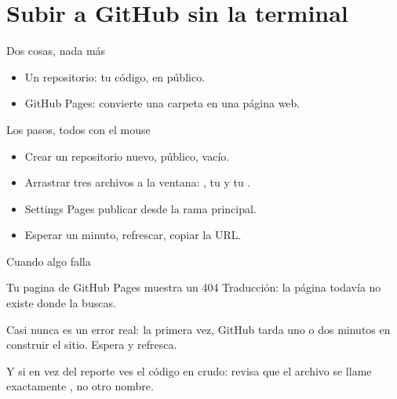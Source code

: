 \section{Subir a GitHub sin la terminal}

\begin{frame}{Dos cosas, nada más}
  \vspace{0.3em}
  \begin{itemize}\setlength{\itemsep}{0.9em}
    \item<1-> Un repositorio: tu código, en público.
    \item<2-> \ac{GitHub Pages}: convierte una carpeta en una página web.
  \end{itemize}

  \vspace{1.2em}
\end{frame}

\begin{frame}{Los pasos, todos con el mouse}
  \vspace{0.2em}
  \begin{itemize}\setlength{\itemsep}{0.75em}
    \item<1-> Crear un repositorio nuevo, público, vacío.
    \item<2-> Arrastrar tres archivos a la ventana: ,
          tu  y tu .
    \item<3-> \ac{Settings} \textrightarrow{} \ac{Pages} \textrightarrow{}
          publicar desde la rama principal.
    \item<4-> Esperar un minuto, refrescar, copiar la URL.
  \end{itemize}

  \vspace{1.0em}
\end{frame}

\begin{frame}{Cuando algo falla}
  \vspace{0.4em}
  \begin{errorbox}{Tu pagina de GitHub Pages muestra un 404}
    Traducción: la página todavía no existe donde la buscas.

    \vspace{0.5em}
    Casi nunca es un error real: la primera vez, GitHub tarda uno o dos
    minutos en construir el sitio. Espera y refresca.
  \end{errorbox}

  \vspace{1.0em}
  Y si en vez del reporte ves el código en crudo: revisa que el archivo se
  llame exactamente , no otro nombre.
\end{frame}

